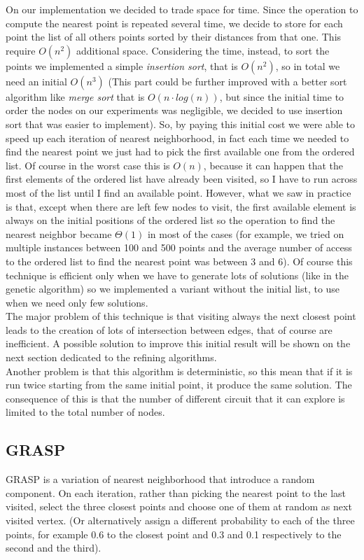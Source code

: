 \noindent On our implementation we decided to trade space for time. Since the operation to compute the nearest point is repeated several time, we decide to store for each point the list of all others points sorted by their distances from that one. This require $O(n^2)$ additional space. Considering the time, instead, to sort the points we implemented a simple \textit{insertion sort}, that is $O(n^2)$, so in total we need an initial $O(n^3)$ (This part could be further improved with a better sort algorithm like \textit{merge sort} that is $O(n \cdot log(n))$, but since the initial time to order the nodes on our experiments was negligible, we decided to use insertion sort that was easier to implement). So, by paying this initial cost we were able to speed up each iteration of nearest neighborhood, in fact each time we needed to find the nearest point we just had to pick the first available one from the ordered list. Of course in the worst case this is $O(n)$, because it can happen that the first elements of the ordered list have already been visited, so I have to run across most of the list until I find an available point. However, what we saw in practice is that, except when there are left few nodes to visit, the first available element is always on the initial positions of the ordered list so the operation to find the nearest neighbor became $\Theta(1)$ in most of the cases (for example, we tried on multiple instances between 100 and 500 points and the average number of access to the ordered list to find the nearest point was between 3 and 6). Of course this technique is efficient only when we have to generate lots of solutions (like in the genetic algorithm) so we implemented a variant without the initial list, to use when we need only few solutions.\\

\noindent The major problem of this technique is that visiting always the next closest point leads to the creation of lots of intersection between edges, that of course are inefficient. A possible solution to improve this initial result will be shown on the next section dedicated to the refining algorithms. \\
Another problem is that this algorithm is deterministic, so this mean that if it is run twice starting from the same initial point, it produce the same solution. The consequence of this is that the number of different circuit that it can explore is limited to the total number of nodes.

\subsection{GRASP}
GRASP is a variation of nearest neighborhood that introduce a random component. On each iteration, rather than picking the nearest point to the last visited, select the three closest points and choose one of them at random as next visited vertex. 
(Or alternatively assign a different probability to each of the three points, for example 0.6 to the closest point and 0.3 and 0.1 respectively to the second and the third).

